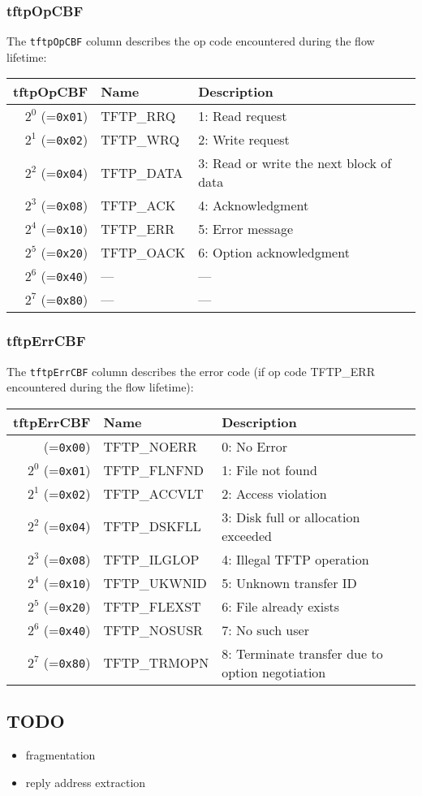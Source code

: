 \documentclass[documentation]{subfiles}
\begin{document}
\subsubsection{tftpOpCBF}\label{tftpOpCBF}
The {\tt tftpOpCBF} column describes the op code encountered during the flow lifetime:
\begin{longtable}{rll}
    \toprule
    {\bf tftpOpCBF} & {\bf Name} & {\bf Description} \\
    \midrule\endhead%
    $2^0$ (={\tt 0x01}) & TFTP\_RRQ & 1: Read request \\
    $2^1$ (={\tt 0x02}) & TFTP\_WRQ & 2: Write request \\
    $2^2$ (={\tt 0x04}) & TFTP\_DATA & 3: Read or write the next block of data \\
    $2^3$ (={\tt 0x08}) & TFTP\_ACK & 4: Acknowledgment \\
    $2^4$ (={\tt 0x10}) & TFTP\_ERR & 5: Error message \\
    $2^5$ (={\tt 0x20}) & TFTP\_OACK & 6: Option acknowledgment \\
    $2^6$ (={\tt 0x40}) & --- & --- \\
    $2^7$ (={\tt 0x80}) & --- & --- \\
    \bottomrule
\end{longtable}

\subsubsection{tftpErrCBF}\label{tftpErrCBF}
The {\tt tftpErrCBF} column describes the error code (if op code TFTP\_ERR encountered during the flow lifetime):
\begin{longtable}{rll}
    \toprule
    {\bf tftpErrCBF} & {\bf Name} & {\bf Description} \\
    \midrule\endhead%
          (={\tt 0x00}) & TFTP\_NOERR  & 0: No Error  \\
    $2^0$ (={\tt 0x01}) & TFTP\_FLNFND & 1: File not found \\
    $2^1$ (={\tt 0x02}) & TFTP\_ACCVLT & 2: Access violation \\
    $2^2$ (={\tt 0x04}) & TFTP\_DSKFLL & 3: Disk full or allocation exceeded \\
    $2^3$ (={\tt 0x08}) & TFTP\_ILGLOP & 4: Illegal TFTP operation \\
    $2^4$ (={\tt 0x10}) & TFTP\_UKWNID & 5: Unknown transfer ID \\
    $2^5$ (={\tt 0x20}) & TFTP\_FLEXST & 6: File already exists \\
    $2^6$ (={\tt 0x40}) & TFTP\_NOSUSR & 7: No such user \\
    $2^7$ (={\tt 0x80}) & TFTP\_TRMOPN & 8: Terminate transfer due to option negotiation \\
    \bottomrule
\end{longtable}

\subsection{TODO}

\begin{itemize}
    \item fragmentation
    \item reply address extraction
\end{itemize}
\end{document}

